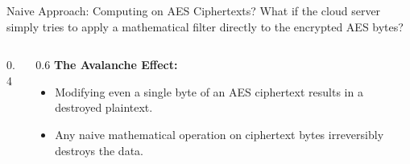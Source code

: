 \documentclass[aspectratio=169, 10pt]{beamer}
\begin{document}
\begin{frame}{Naive Approach: Computing on AES Ciphertexts?}
    What if the cloud server simply tries to apply a mathematical filter directly to the encrypted AES bytes?
    \vspace{0.5cm}
    
    \begin{columns}
        \begin{column}{0.4\textwidth}
            \centering
        \end{column}
        \begin{column}{0.6\textwidth}
            \textbf{The Avalanche Effect:}
            \begin{itemize}
                \item Modifying even a single byte of an AES ciphertext results in a destroyed plaintext.
                \item Any naive mathematical operation on ciphertext bytes irreversibly destroys the data.
            \end{itemize}
        \end{column}
    \end{columns}
\end{frame}
\end{document}
